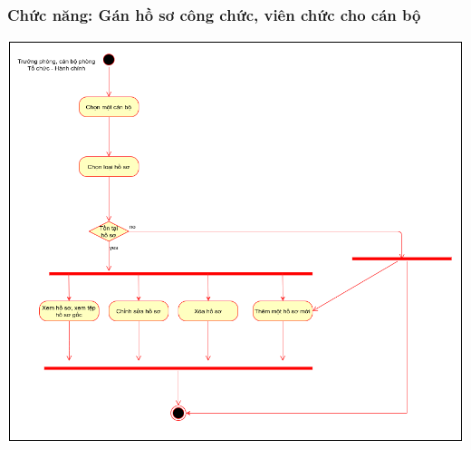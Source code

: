 \subsubsection{Chức năng: Gán hồ sơ công chức, viên chức cho cán bộ}
\begin{center}
  \captionsetup{type=figure}
  \includegraphics[width=15cm]{img/UML/Manager/activityQuanLyHoSo.png}
\end{center}

